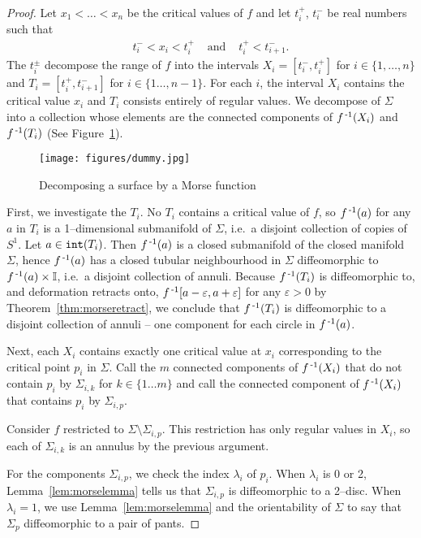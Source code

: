 \begin{proof}
	Let $x_1<\dots<x_n$ be the critical values of $f$ and let $t_i^+$, $t_i^-$ be real numbers such that
	\[
		\begin{array}{ccc}
			t_i^-<x_i<t_i^+ & \textrm{ and } & t_i^+<t_{i+1}^-. 		
		\end{array}
	\]
	The $t_i^\pm$ decompose the range of $f$ into the intervals $X_i=[t_i^-,t_i^+]$ for $i\in\{1,\dots,n\}$ and $T_i=[t_i^+,t_{i+1}^-]$ for $i\in\{1\dots, n-1\}$.
	For each $i$, the interval $X_i$ contains the critical value $x_i$ and $T_i$ consists entirely of regular values.
	We decompose of $\Sigma$ into a collection whose elements are the connected components of $f^{\,\text{-}1}(X_i)$ and $f^{\,\text{-}1}(T_i)$ (See Figure~\ref{fig:sigmadecomp}).
	
	\begin{figure}
		\centering
		\caption{Decomposing a surface by a Morse function}
		\texttt{[image: figures/dummy.jpg]}
		\label{fig:sigmadecomp}
	\end{figure}
		
	First, we investigate the $T_i$.
	No $T_i$ contains a critical value of $f$, so $f^{\,\text{-}1}(a)$ for any $a$ in $T_i$ is a 1--dimensional submanifold of $\Sigma$, i.e.\ a disjoint collection of copies of $S^1$.
	Let $a\in\mathtt{int}(T_i)$.
	Then $f^{\,\text{-}1} (a)$ is a closed submanifold of the closed manifold $\Sigma$, hence $f^{\,\text{-}1}(a)$ has a closed tubular neighbourhood in $\Sigma$ diffeomorphic to $f^{\,\text{-}1} (a)\times \mathbb{I}$, i.e.\ a disjoint collection of annuli.
	Because $f^{\,\text{-}1}(T_i)$ is diffeomorphic to, and deformation retracts onto, $f^{\,\text{-}1}[a-\varepsilon,a+\varepsilon]$ for any $\varepsilon>0$ by Theorem~\ref{thm:morseretract}, we conclude that $f^{\,\text{-}1}(T_i)$ is diffeomorphic to a disjoint collection of annuli -- one component for each circle in $f^{\,\text{-}1}(a)$.
	
	Next, each $X_i$ contains exactly one critical value at $x_i$ corresponding to the critical point $p_i$ in $\Sigma$.
	Call the $m$ connected components of $f^{\,\text{-}1}(X_i)$ that do not contain $p_i$ by $\Sigma_{i,k}$ for $k\in\{1\dots m\}$ and call the connected component of $f^{\,\text{-}1}(X_i)$ that contains $p_i$ by $\Sigma_{i,p}$.
	
	Consider $f$ restricted to $\Sigma\setminus\Sigma_{i,p}$.
	This restriction has only regular values in $X_i$, so each of $\Sigma_{i,k}$ is an annulus by the previous argument.
	
	For the components $\Sigma_{i,p}$, we check the index $\lambda_i$ of $p_i$.
	When $\lambda_i$ is 0 or 2, Lemma~\ref{lem:morselemma} tells us that $\Sigma_{i,p}$ is diffeomorphic to a 2--disc.
	When $\lambda_i=1$, we use Lemma~\ref{lem:morselemma} and the orientability of $\Sigma$ to say that $\Sigma_p$ diffeomorphic to a pair of pants.
	

\end{proof}
